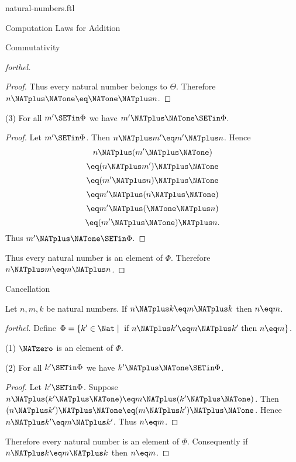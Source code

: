\documentclass{naproche-library}
\begin{document}
\begin{smodule}[title=Natural Numbers]{natural-numbers.ftl}
\begin{sfragment}{Computation Laws for Addition}
\begin{sfragment}{Commutativity}
\begin{proof}[forthel]
\begin{proof}
        Thus every natural number belongs to $\Theta$.
        Therefore $n \NATplus \NATone \eq \NATone \NATplus n$.
      \end{proof}

      (3) For all $m' \SETin \Phi$ we have $m' \NATplus \NATone \SETin \Phi$.
      \begin{proof}
        Let $m' \SETin \Phi$.
        Then $n \NATplus m' \eq m' \NATplus n$.
        Hence
        \[  n \NATplus (m'  \NATplus \NATone)       \]
        \[    \eq (n \NATplus m') \NATplus \NATone    \]
        \[    \eq (m' \NATplus n) \NATplus \NATone    \]
        \[    \eq m' \NATplus (n \NATplus \NATone)    \]
        \[    \eq m' \NATplus (\NATone \NATplus n)    \]
        \[    \eq (m' \NATplus \NATone) \NATplus n.   \]
        Thus $m' \NATplus \NATone \SETin \Phi$.
      \end{proof}

      Thus every natural number is an element of $\Phi$.
      Therefore $n \NATplus m \eq m \NATplus n$.
    \end{proof}
  \end{sfragment}

  \begin{sfragment}{Cancellation}
    \begin{proposition}[forthel,id=ARITHMETIC_03_3137702874578944]
      Let $n, m, k$ be natural numbers.
      If $n \NATplus k \eq m \NATplus k$ then $n \eq m$.
    \end{proposition}
    \begin{proof}[forthel]
      Define $\Phi = \{ k' \in \Nat \mid\text{ if }n \NATplus k' \eq m \NATplus k'\text{ then }n \eq m \}$.

      (1) $\NATzero$ is an element of $\Phi$.

      (2) For all $k' \SETin \Phi$ we have $k' \NATplus \NATone \SETin \Phi$.
      \begin{proof}
        Let $k' \SETin \Phi$.
        Suppose $n \NATplus (k' \NATplus \NATone) \eq m \NATplus (k' \NATplus \NATone)$.
        Then $(n \NATplus k') \NATplus \NATone \eq (m \NATplus k') \NATplus \NATone$.
        Hence $n \NATplus k' \eq m \NATplus k'$.
        Thus $n \eq m$.
      \end{proof}

      Therefore every natural number is an element of $\Phi$.
      Consequently if $n \NATplus k \eq m \NATplus k$ then $n \eq m$.
    \end{proof}


\end{sfragment}
\end{sfragment}
\end{smodule}
\end{document}
